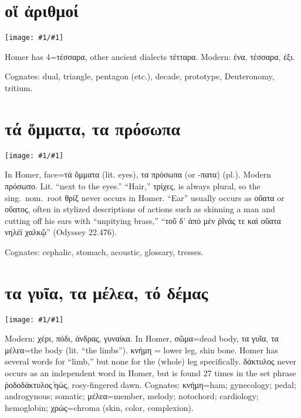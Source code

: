 \documentclass[12pt,openany]{book}
\newenvironment{notes}{\vfill\scriptsize\begin{flushright}}{\end{flushright}}
\newcommand{\fig}[1]{\begin{center}\texttt{[image: \#1/\#1]}\end{center}}
\begin{document}

\chapter{οἵ ἀριθμοί}

\fig{numbers}

\begin{notes}
Homer has 4=τέσσαρα, other ancient dialects τέτταρα.
Modern: ένα, τέσσαρα, έξι.

Cognates: dual, triangle, pentagon (etc.), decade,
prototype, Deuteronomy, tritium.
\end{notes}


\chapter{τά ὄμματα, τα πρόσωπα}

\fig{face}

\begin{notes}
In Homer, face=τά ὄμματα (lit. eyes), τα πρόσωπα (or -πατα) (pl.).
Modern πρόσωπο. Lit. ``next to the eyes.''
``Hair,'' τρίχες, is always plural, so the sing.~nom.~root θρίξ never occurs in Homer.
``Ear'' usually occurs as οὔατα or οὔατος, often in stylized descriptions of actions such as
skinning a man and cutting off his ears with ``unpitying brass,'' ``τοῦ δ' ἀπὸ μὲν ῥῖνάς τε καὶ οὔατα νηλέϊ χαλκῷ'' (Odyssey 22.476).


Cognates: cephalic, stomach,
acoustic, glossary, tresses.
\end{notes}


\chapter{τα γυῖα, τα μέλεα, τό δέμας}

\fig{body}

\begin{notes}
Modern: χέρι, πόδι, άνδρας, γυναίκα. In Homer, σῶμα=dead body, τα γυῖα, τα μέλεα=the body (lit. ``the limbs'').
κνήμη = lower leg, shin bone. Homer has several words for ``limb,'' but none for the (whole) leg specifically.
δάκτυλος never occurs as an independent word in Homer, but is found 27 times in the
set phrase ῥοδοδάκτυλος ̓ηώς, rosy-fingered dawn. Cognates: κνήμη=ham; gynecology; pedal; androgynous; somatic; μέλεα=member, melody;
notochord; cardiology; hemoglobin; χρώς=chroma (skin, color, complexion).
\end{notes}
\end{document}
